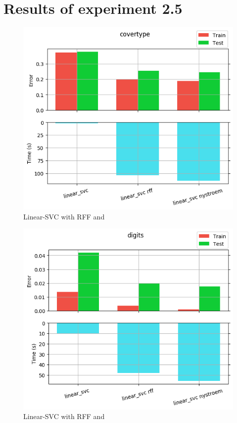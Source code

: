 
\chapter{Results of experiment 2.5} %

\label{Appendix2-5} %

\begin{figure}[th]
\centering
\includegraphics[scale=\imgscale]{Figures/2_5/covertype}
\decoRule
\caption[2.5 covertype]{Linear-SVC with RFF and \Nys}
\label{fig:2_5_covertype}
\end{figure}

\begin{figure}[th]
\centering
\includegraphics[scale=\imgscale]{Figures/2_5/digits}
\decoRule
\caption[2.5 digits]{Linear-SVC with RFF and \Nys}
\label{fig:2_5_digits}
\end{figure}


